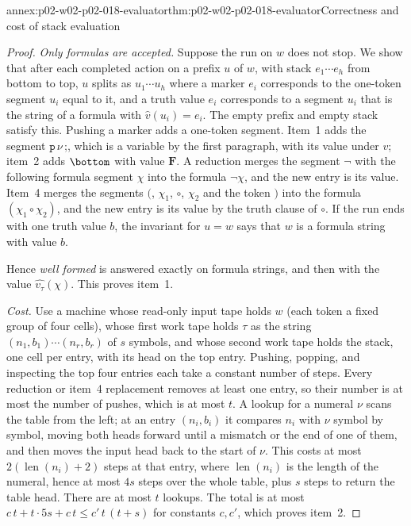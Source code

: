 \begin{annexitem}{annex:p02-w02-p02-018-evaluator}{thm:p02-w02-p02-018-evaluator}{Correctness and cost of stack evaluation}
\begin{proof}
\emph{Only formulas are accepted.}  Suppose the run on \(w\) does not stop.
We show that after each completed action on a prefix \(u\) of \(w\), with
stack \(e_1\cdots e_h\) from bottom to top, \(u\) splits as
\(u_1\cdots u_h\) where a marker \(e_i\) corresponds to the one-token segment
\(u_i\) equal to it, and a truth value \(e_i\) corresponds to a segment
\(u_i\) that is the string of a formula with \(\widehat v(u_i)=e_i\).  The
empty prefix and empty stack satisfy this.  Pushing a marker adds a
one-token segment.  Item~1 adds the segment \(\texttt{p}\,\nu\,\texttt{;}\),
which is a variable by the first paragraph, with its value under \(v\); item~2
adds \(\bottom\) with value \(\mathbf F\).  A reduction merges the segment
\(\neg\) with the following formula segment \(\chi\) into the formula
\(\neg\chi\), and the new entry is its value.  Item~4 merges the segments
\((\), \(\chi_1\), \(\circ\), \(\chi_2\) and the token \()\) into the formula
\((\chi_1\circ\chi_2)\), and the new entry is its value by the truth clause of
\(\circ\).  If the run ends with one truth value \(b\), the invariant for
\(u=w\) says that \(w\) is a formula string with value \(b\).

Hence \emph{well formed} is answered exactly on formula strings, and then
with the value \(\widehat{v_\tau}(\chi)\).  This proves item~1.

\emph{Cost.}  Use a machine whose read-only input tape holds \(w\) (each token
a fixed group of four cells), whose first work tape holds \(\tau\) as the
string \((n_1,b_1)\cdots(n_r,b_r)\) of \(s\) symbols, and whose second work
tape holds the stack, one cell per entry, with its head on the top entry.
Pushing, popping, and inspecting the top four entries each take a constant
number of steps.  Every reduction or item~4 replacement removes at least one
entry, so their number is at most the number of pushes, which is at most
\(t\).  A lookup for a numeral \(\nu\) scans the table from the left; at an
entry \((n_i,b_i)\) it compares \(n_i\) with \(\nu\) symbol by symbol, moving
both heads forward until a mismatch or the end of one of them, and then
moves the input head back to the start of \(\nu\).  This costs at most
\(2(\operatorname{len}(n_i)+2)\) steps at that entry, where \(\operatorname{len}(n_i)\) is the length of
the numeral, hence at most \(4s\) steps over the whole table, plus \(s\)
steps to return the table head.  There are at most \(t\) lookups.  The total
is at most \(c\,t+t\cdot5s+c\,t\leq c'\,t\,(t+s)\) for constants \(c,c'\),
which proves item~2.
\end{proof}
\end{annexitem}

